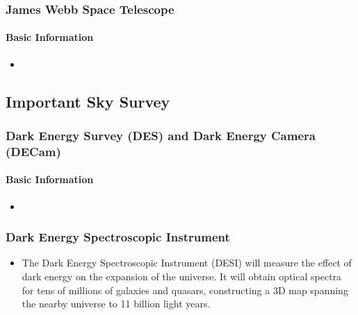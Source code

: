 \documentclass[letterpaper,10pt,english]{sphinxmanual}
\begin{document}
\subsubsection{James Webb Space Telescope}
\label{\detokenize{resource/astro/projects/jwst:james-webb-space-telescope}}\label{\detokenize{resource/astro/projects/jwst::doc}}

\paragraph{Basic Information}
\label{\detokenize{resource/astro/projects/jwst:basic-information}}\begin{itemize}
\item {} 

\end{itemize}


\subsection{Important Sky Survey}
\label{\detokenize{astro_project:important-sky-survey}}

\subsubsection{Dark Energy Survey (DES) and Dark Energy Camera (DECam)}
\label{\detokenize{resource/astro/projects/des:dark-energy-survey-des-and-dark-energy-camera-decam}}\label{\detokenize{resource/astro/projects/des::doc}}

\paragraph{Basic Information}
\label{\detokenize{resource/astro/projects/des:basic-information}}\begin{itemize}
\item {} 

\end{itemize}


\subsubsection{Dark Energy Spectroscopic Instrument}
\label{\detokenize{resource/astro/projects/desi:dark-energy-spectroscopic-instrument}}\label{\detokenize{resource/astro/projects/desi::doc}}\begin{itemize}
\item {} 
The Dark Energy Spectroscopic Instrument (DESI) will measure the
effect of dark energy on the expansion of the universe. It will
obtain optical spectra for tens of millions of galaxies and quasars,
constructing a 3D map spanning the nearby universe to 11 billion
light years.

\end{itemize}
\end{document}
